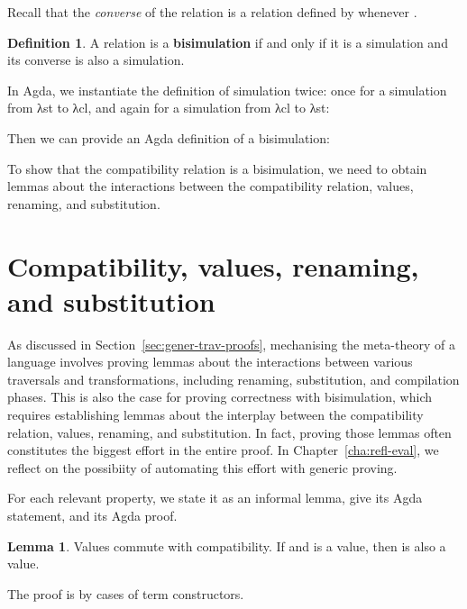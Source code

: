 \documentclass[bsc,frontabs,oneside,singlespacing,parskip,deptreport]{infthesis}
\theoremstyle{definition}
\newtheorem*{definition}{Definition}
\theoremstyle{lemma}
\newtheorem*{lemma}{Lemma}
\begin{document}
Recall that the \textit{converse} of the relation  is a relation
 defined by  whenever .

\begin{definition}
  A relation  is a \textbf{bisimulation} if and only if it is a
  simulation and its converse is also a simulation.
\end{definition}

In Agda, we instantiate the definition of simulation twice: once for a
simulation from λst to λcl, and again for a simulation from λcl to
λst:


Then we can provide an Agda definition of a bisimulation:


To show that the compatibility relation is a bisimulation, we need to
obtain lemmas about the interactions between the compatibility
relation, values, renaming, and substitution.

\section{Compatibility, values, renaming, and substitution}
\label{sec:comp-valu-renam}

As discussed in Section~\ref{sec:gener-trav-proofs}, mechanising the
meta-theory of a language involves proving lemmas about the
interactions between various traversals and transformations, including
renaming, substitution, and compilation phases. This is also the case
for proving correctness with bisimulation, which requires establishing
lemmas about the interplay between the compatibility relation, values,
renaming, and substitution. In fact, proving those lemmas often
constitutes the biggest effort in the entire proof. In
Chapter~\ref{cha:refl-eval}, we reflect on the possibiity of
automating this effort with generic proving.

For each relevant property, we state it as an informal lemma, give its
Agda statement, and its Agda proof.

\begin{lemma}{Values commute with compatibility.}
  If  and  is a value, then  is also a
  value.
\end{lemma}

The proof is by cases of term constructors.
\end{document}
